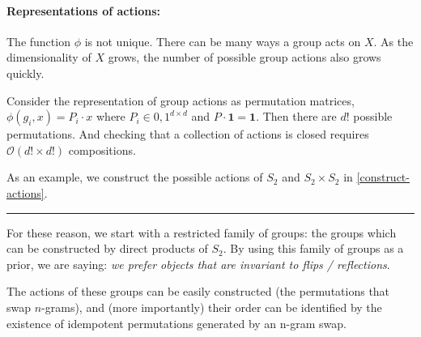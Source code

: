 


\paragraph{Representations of actions:} The function $\phi$ is not unique. There can be many ways
a group acts on $X$. As the dimensionality of $X$ grows, the number of possible group actions also grows quickly.


Consider the representation of group actions as permutation matrices, $\phi(g_i, x) = P_i \cdot x$ where $P_i \in {0, 1}^{d\times d}$ and $P \cdot \mathbf 1 = \mathbf 1$.
Then there are $d!$ possible permutations.
 And checking that a collection of actions is closed requires $\mathcal O(d! \times d!)$ compositions.\footnotemark

 As an example, we construct the possible actions of $S_2$ and $S_2 \times S_2$ in \ref{construct-actions}.



\begin{center}\rule{0.5\linewidth}{\linethickness}\end{center}

For these reason, we start with a restricted family of groups:
the groups which can be constructed by direct products of $S_2$.
By using this family of groups as a prior, we are saying: \textit{we prefer objects that are invariant to flips / reflections}.

The actions of these groups can be easily constructed (the permutations that swap $n$-grams\footnotemark), and (more importantly)
their order can be identified by the existence of idempotent permutations generated by an n-gram swap.

